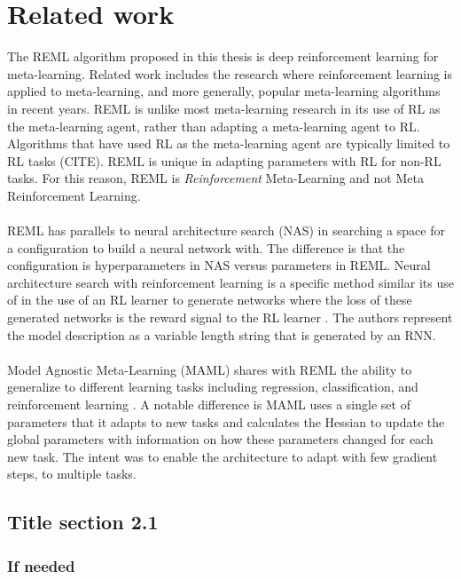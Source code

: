 \chapter{Related work}
\label{ch2}

\minitoc 
The REML algorithm proposed in this thesis is deep reinforcement 
learning for meta-learning. 
Related work includes the research 
where reinforcement learning is applied to meta-learning, and more
generally, popular meta-learning algorithms in recent years. 
REML is
unlike most meta-learning research in its use of RL as the meta-learning agent,
rather than adapting a meta-learning agent to RL. Algorithms that have used
RL as the meta-learning agent are typically limited to RL tasks (CITE). REML is 
unique in adapting parameters with RL for non-RL tasks. For this reason, REML is 
\textit{Reinforcement} Meta-Learning and not Meta Reinforcement Learning. 
\\\\ 
REML has parallels to neural architecture search (NAS) in searching a space for
a configuration to build a neural network with. The difference is that the configuration
is hyperparameters in NAS versus parameters in REML. Neural architecture search with
reinforcement learning is a specific method similar its use of in the use of an RL learner
to generate networks where the loss of these generated networks is the reward 
signal to the RL learner \cite{ZophQuoc:16}. The authors represent the model description 
as a variable length string that is generated by an RNN. 
\\\\
Model Agnostic Meta-Learning (MAML) shares with REML the ability to generalize to different
learning tasks including regression, classification, and reinforcement learning 
\cite{FinAbbLev:17}. A notable difference is MAML uses a single set of parameters that
it adapts to new tasks and calculates the Hessian to update the global parameters with
information on how these parameters changed for each new task. The intent was to enable 
the architecture to adapt with few gradient steps, to multiple tasks. 



\section{Title section 2.1}



\subsection{If needed}



